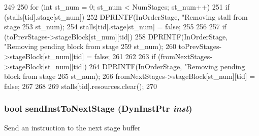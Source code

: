 \begin{DoxyCode}
249 {
250     for (int st_num = 0; st_num < NumStages; st_num++) {
251         if (stalls[tid].stage[st_num]) {
252             DPRINTF(InOrderStage, "Removing stall from stage %
253                     st_num);
254             stalls[tid].stage[st_num] = false;
255         }
256 
257         if (toPrevStages->stageBlock[st_num][tid]) {
258             DPRINTF(InOrderStage, "Removing pending block from stage %
259                     st_num);
260             toPrevStages->stageBlock[st_num][tid] = false;
261         }
262 
263         if (fromNextStages->stageBlock[st_num][tid]) {
264             DPRINTF(InOrderStage, "Removing pending block from stage %
265                     st_num);
266             fromNextStages->stageBlock[st_num][tid] = false;
267         }
268     }
269     stalls[tid].resources.clear();
270 }
\end{DoxyCode}
\hypertarget{classPipelineStage_a3a5710b990e95498611464d54c90dcf1}{
\subsubsection[{sendInstToNextStage}]{\setlength{\rightskip}{0pt plus 5cm}bool sendInstToNextStage ({\bf DynInstPtr} {\em inst})}}
\label{classPipelineStage_a3a5710b990e95498611464d54c90dcf1}
Send an instruction to the next stage buffer 



